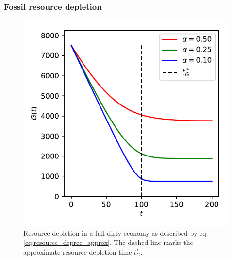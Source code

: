 \subsubsection{Fossil resource depletion}
\label{sec:resource_depletion}
\begin{figure}
    \vspace{-.8 cm}
	\includegraphics[width = .6 \textwidth]{figures/g_depletion.pdf}
	\caption{Resource depletion in a full dirty economy as described by eq. \eqref{eq:resource_deprec_approx}. The dashed line marks the approximate resource depletion time $t^*_G$. \label{fig:g_depletion}}
\end{figure}


